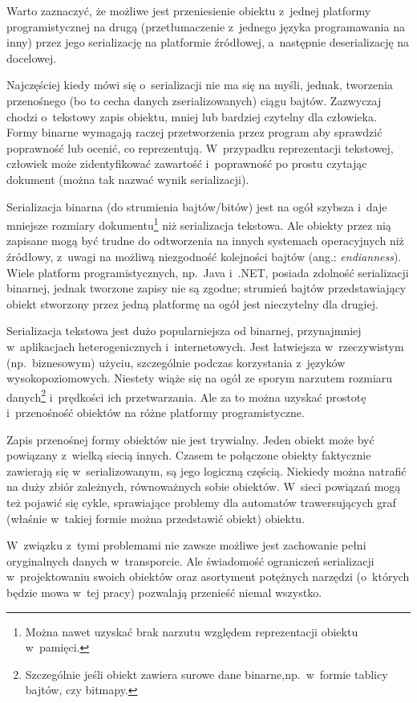 Warto zaznaczyć, że możliwe jest przeniesienie obiektu z~jednej platformy programistycznej na drugą (przetłumaczenie z~jednego języka programawania na inny) przez jego serializację na platformie źródłowej, a~następnie deserializację na docelowej.

Najczęściej kiedy mówi się o~serializacji nie ma się na myśli, jednak, tworzenia przenośnego (bo to cecha danych zserializowanych) ciągu bajtów. Zazwyczaj chodzi o~tekstowy zapis obiektu, mniej lub bardziej czytelny dla człowieka. Formy binarne wymagają raczej przetworzenia przez program aby sprawdzić poprawność lub ocenić, co reprezentują. W~przypadku reprezentacji tekstowej, człowiek może zidentyfikować zawartość i~poprawność po prostu czytając dokument (można tak nazwać wynik serializacji).

Serializacja binarna (do strumienia bajtów/bitów) jest na ogół szybsza i~daje mniejsze rozmiary dokumentu\footnote{Można nawet uzyskać brak narzutu względem reprezentacji obiektu w~pamięci.} niż serializacja tekstowa.
Ale obiekty przez nią zapisane mogą być trudne do odtworzenia na innych systemach operacyjnych niż źródłowy, z~uwagi na możliwą niezgodność kolejności bajtów (ang.: \emph{endianness}). Wiele platform programistycznych, np.\ Java i~.NET, posiada zdolność serializacji binarnej, jednak tworzone zapisy nie są zgodne; strumień bajtów przedstawiający obiekt stworzony przez jedną platformę na ogół jest nieczytelny dla drugiej.

Serializacja tekstowa jest dużo popularniejsza od binarnej, przynajmniej w~aplikacjach heterogenicznych i~internetowych. Jest łatwiejsza w~rzeczywistym (np.\ biznesowym) użyciu, szczególnie podczas korzystania z~języków wysokopoziomowych.
Niestety wiąże się na ogół ze sporym narzutem rozmiaru danych\footnote{Szczególnie jeśli obiekt zawiera surowe dane binarne,np.\ w~formie tablicy bajtów, czy bitmapy.} i~prędkości ich przetwarzania.
Ale za to można uzyskać prostotę i~przenośność obiektów na różne platformy programistyczne.

Zapis przenośnej formy obiektów nie jest trywialny. Jeden obiekt może być powiązany z~wielką siecią innych. Czasem te połączone obiekty faktycznie zawierają się w~serializowanym, są jego logiczną częścią. Niekiedy można natrafić na duży zbiór zależnych, równoważnych sobie obiektów. W~sieci powiązań mogą też pojawić się cykle, sprawiające problemy dla automatów trawersujących graf (właśnie w~takiej formie można przedstawić obiekt) obiektu.

W~związku z~tymi problemami nie zawsze możliwe jest zachowanie pełni oryginalnych danych w~transporcie.
Ale świadomość ograniczeń serializacji w~projektowaniu swoich obiektów oraz asortyment potężnych narzędzi (o~których będzie mowa w~tej pracy) pozwalają przenieść niemal wszystko.

